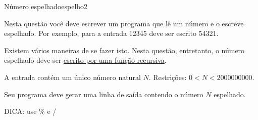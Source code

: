\documentclass[12pt,a4paper,oneside]{article}
\begin{document}
\begin{problem}{Número espelhado}{espelho}{2}

Nesta questão você deve escrever um programa que lê um número e o
escreve espelhado. Por exemplo, para a entrada 12345 deve ser
escrito 54321.

Existem vários maneiras de se fazer isto. Nesta questão, entretanto, o
número espelhado deve ser \underline{escrito por uma função recursiva}.

%


\InputFile

A entrada contém um único número natural $N$. Restrições: $0 < N < 2000000000$.

\OutputFile

Seu programa deve gerar uma linha de saída contendo o número $N$ espelhado.

\Example


\begin{example}
%
\end{example}

\begin{example}
%
\end{example}


\begin{example}
%
\end{example}

\vspace{0.5cm}
DICA: use \% e /

\end{problem}
\end{document}
